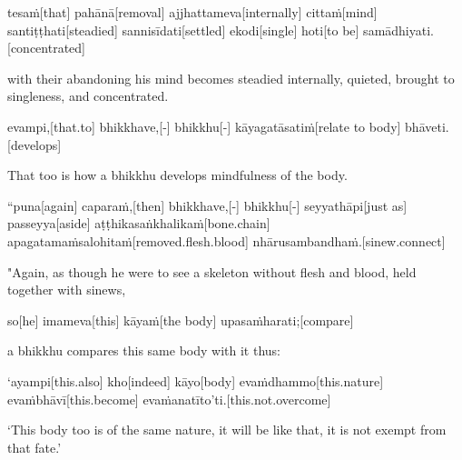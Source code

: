 \begin{samepage}
\begingl[glneveryline={\PaliGlossA,\PaliGlossB}]
tesaṁ[that] pahānā[removal] ajjhattameva[internally] cittaṁ[mind] santiṭṭhati[steadied] sannisīdati[settled] ekodi[single] hoti[to be] samādhiyati.[concentrated]
\endgl
\nopagebreak
\linespread{0.5}
\begin{spacin}{0.2}
{\PaliGlossFT with their abandoning his mind becomes steadied internally, quieted, brought to singleness, and concentrated.}
\end{spacin}
\vskip 12pt
\end{samepage}
\begin{samepage}
\begingl[glneveryline={\PaliGlossA,\PaliGlossB}]
evampi,[that.to] bhikkhave,[-] bhikkhu[-] kāyagatāsatiṁ[relate to body] bhāveti.[develops]
\endgl
\nopagebreak
\linespread{0.5}
\begin{spacin}{0.2}
{\PaliGlossFT That too is how a bhikkhu develops mindfulness of the body.}
\end{spacin}
\vskip 12pt
\end{samepage}
\vskip 0.2in
\begin{samepage}
\begingl[glneveryline={\PaliGlossA,\PaliGlossB}]
“puna[again] caparaṁ,[then] bhikkhave,[-] bhikkhu[-] seyyathāpi[just as] passeyya[aside] aṭṭhikasaṅkhalikaṁ[bone.chain] apagatamaṁsalohitaṁ[removed.flesh.blood] nhārusambandhaṁ.[sinew.connect]
\endgl
\nopagebreak
\linespread{0.5}
\begin{spacin}{0.2}
{\PaliGlossFT "Again, as though he were to see a skeleton without flesh and blood, held together with sinews,}
\end{spacin}
\vskip 12pt
\end{samepage}
\begin{samepage}
\begingl[glneveryline={\PaliGlossA,\PaliGlossB}]
so[he] imameva[this] kāyaṁ[the body] upasaṁharati;[compare]
\endgl
\nopagebreak
\linespread{0.5}
\begin{spacin}{0.2}
{\PaliGlossFT a bhikkhu compares this same body with it thus:}
\end{spacin}
\vskip 12pt
\end{samepage}
\begin{samepage}
\begingl[glneveryline={\PaliGlossA,\PaliGlossB}]
‘ayampi[this.also] kho[indeed] kāyo[body] evaṁdhammo[this.nature] evaṁbhāvī[this.become] evaṁanatīto’ti.[this.not.overcome]
\endgl
\nopagebreak
\linespread{0.5}
\begin{spacin}{0.2}
{\PaliGlossFT ‘This body too is of the same nature, it will be like that, it is not exempt from that fate.’}
\end{spacin}
\vskip 12pt
\end{samepage}
